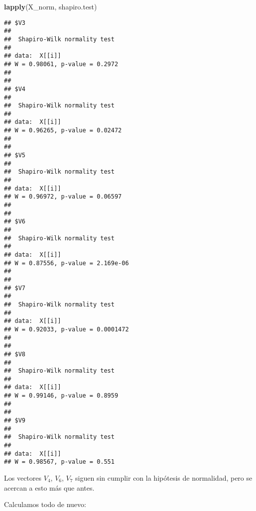 \documentclass[]{article}
\newenvironment{Shaded}{\begin{snugshade}}{\end{snugshade}}
\newcommand{\ControlFlowTok}[1]{\textcolor[rgb]{0.13,0.29,0.53}{\textbf{#1}}}
\newcommand{\DataTypeTok}[1]{\textcolor[rgb]{0.13,0.29,0.53}{#1}}
\newcommand{\DecValTok}[1]{\textcolor[rgb]{0.00,0.00,0.81}{#1}}
\newcommand{\FloatTok}[1]{\textcolor[rgb]{0.00,0.00,0.81}{#1}}
\newcommand{\KeywordTok}[1]{\textcolor[rgb]{0.13,0.29,0.53}{\textbf{#1}}}
\newcommand{\NormalTok}[1]{#1}
\newcommand{\OperatorTok}[1]{\textcolor[rgb]{0.81,0.36,0.00}{\textbf{#1}}}
\newcommand{\OtherTok}[1]{\textcolor[rgb]{0.56,0.35,0.01}{#1}}
\newcommand{\StringTok}[1]{\textcolor[rgb]{0.31,0.60,0.02}{#1}}
\begin{document}
\begin{Shaded}
\begin{Highlighting}[]
\KeywordTok{lapply}\NormalTok{(X_norm, shapiro.test)}
\end{Highlighting}
\end{Shaded}

\begin{verbatim}
## $V3
## 
##  Shapiro-Wilk normality test
## 
## data:  X[[i]]
## W = 0.98061, p-value = 0.2972
## 
## 
## $V4
## 
##  Shapiro-Wilk normality test
## 
## data:  X[[i]]
## W = 0.96265, p-value = 0.02472
## 
## 
## $V5
## 
##  Shapiro-Wilk normality test
## 
## data:  X[[i]]
## W = 0.96972, p-value = 0.06597
## 
## 
## $V6
## 
##  Shapiro-Wilk normality test
## 
## data:  X[[i]]
## W = 0.87556, p-value = 2.169e-06
## 
## 
## $V7
## 
##  Shapiro-Wilk normality test
## 
## data:  X[[i]]
## W = 0.92033, p-value = 0.0001472
## 
## 
## $V8
## 
##  Shapiro-Wilk normality test
## 
## data:  X[[i]]
## W = 0.99146, p-value = 0.8959
## 
## 
## $V9
## 
##  Shapiro-Wilk normality test
## 
## data:  X[[i]]
## W = 0.98567, p-value = 0.551
\end{verbatim}

Los vectores \(V_4\), \(V_6\), \(V_7\) siguen sin cumplir con la
hipótesis de normalidad, pero se acercan a esto más que antes.

Calculamos todo de nuevo:

\begin{Shaded}
\end{Shaded}
\end{document}

